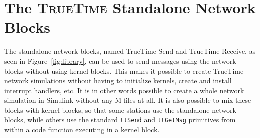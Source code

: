 \documentclass[final,twoside]{rapport}
\begin{document}
\section{The \textsc{TrueTime} Standalone Network Blocks}
\label{sec:battery}
The standalone network blocks, named TrueTime Send and TrueTime Receive, as seen in Figure~\ref{fig:library}, can be used to send
messages using the network blocks without using kernel blocks. This
makes it possible to create TrueTime network simulations without
having to initialize kernels, create and install interrupt handlers,
etc. It is in other words possible to create a whole network
simulation in Simulink without any M-files at all. It is also possible
to mix these blocks with kernel blocks, so that some stations use the
standalone network blocks, while others use the standard {\tt ttSend}
and {\tt ttGetMsg} primitives from within a code function executing in
a kernel block.
\end{document}

